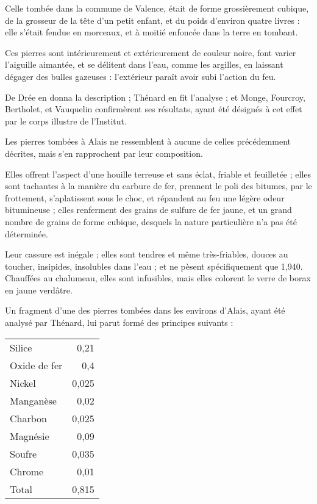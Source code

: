 \documentclass[a4paper, 12pt, oneside, french]{article}
\begin{document}
Celle tombée dans la commune de Valence, était de forme grossièrement cubique, de la grosseur de la tête d'un petit enfant, et du poids d'environ quatre livres : elle s'était fendue en morceaux, et à moitié enfoncée dans la terre en tombant.

Ces pierres sont intérieurement et extérieurement de couleur noire, font varier l'aiguille aimantée, et se délitent dans l'eau, comme les argilles, en laissant dégager des bulles gazeuses : l'extérieur paraît avoir subi l'action du feu.

De Drée en donna la description ; Thénard en fit l'analyse ; et Monge, Fourcroy, Bertholet, et Vauquelin confirmèrent ses résultats, ayant été désignés à cet effet par le corps illustre de l'Institut.

Les pierres tombées à Alais ne ressemblent à aucune de celles précédemment décrites, mais s'en rapprochent par leur composition.

Elles offrent l'aspect d'une houille terreuse et sans éclat, friable et feuilletée ; elles sont tachantes à la manière du carbure de fer, prennent le poli des bitumes, par le frottement, s'aplatissent sous le choc, et répandent au feu une légère odeur bitumineuse ; elles renferment des grains de sulfure de fer jaune, et un grand nombre de grains de forme cubique, desquels la nature particulière n'a pas été déterminée.

Leur cassure est inégale ; elles sont tendres et même très-friables, douces au toucher, insipides, insolubles dans l'eau ; et ne pèsent spécifiquement que 1,940. Chauffées au chalumeau, elles sont infusibles, mais elles colorent le verre de borax en jaune verdâtre.

Un fragment d'une des pierres tombées dans les environs d'Alais, ayant été analysé par Thénard, lui parut formé des principes suivants :
\begin{table}[H]
    \centering
    \Fontauri
    \large
    \begin{tabular}{l r}
        Silice & 0,21 \\
        Oxide de fer & 0,4 \\
        Nickel & 0,025 \\
        Manganèse & 0,02 \\
        Charbon & 0,025 \\
        Magnésie & 0,09 \\
        Soufre & 0,035 \\
        Chrome & 0,01 \\ \hline
        Total & 0,815 \\
    \end{tabular}
\end{table}
\end{document}
